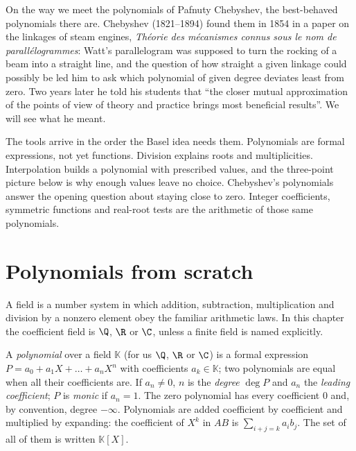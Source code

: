 On the way we meet the polynomials of Pafnuty Chebyshev, the best-behaved polynomials there are. Chebyshev (1821--1894) found them in 1854 in a
paper on the linkages of steam engines, \emph{Th\'eorie des m\'ecanismes connus sous le nom de parall\'elogrammes}: Watt's parallelogram was
supposed to turn the rocking of a beam into a straight line, and the question of how straight a given linkage could possibly be led him to ask
which polynomial of given degree deviates least from zero. Two years later he told his students that ``the closer mutual approximation of the
points of view of theory and practice brings most beneficial results''. We will see what he meant.

The tools arrive in the order the Basel idea needs them. Polynomials are formal expressions, not yet functions. Division explains roots and multiplicities. Interpolation builds a polynomial with prescribed values, and the three-point picture below is why enough values leave no choice. Chebyshev's polynomials answer the opening question about staying close to zero. Integer coefficients, symmetric functions and real-root tests are the arithmetic of those same polynomials.


\section{Polynomials from scratch}

A field is a number system in which addition, subtraction, multiplication and division by a nonzero element obey the familiar arithmetic laws. In this chapter the coefficient field is $\Q$, $\R$ or $\C$, unless a finite field is named explicitly.

\begin{definitionx}
A \emph{polynomial} over a field $\mathbb K$ (for us $\Q$, $\R$ or $\C$) is a formal expression $P=a_0+a_1X+\dots+a_nX^n$ with coefficients
$a_k\in\mathbb K$; two polynomials are equal when all their coefficients are. If $a_n\ne0$, $n$ is the \emph{degree} $\deg P$ and $a_n$ the
\emph{leading coefficient}; $P$ is \emph{monic} if $a_n=1$. The zero polynomial has every coefficient $0$ and, by convention, degree $-\infty$.
Polynomials are added coefficient by coefficient and multiplied by expanding: the coefficient of $X^k$ in $AB$ is $\sum_{i+j=k}a_ib_j$.
The set of all of them is written $\mathbb K[X]$.
\end{definitionx}

